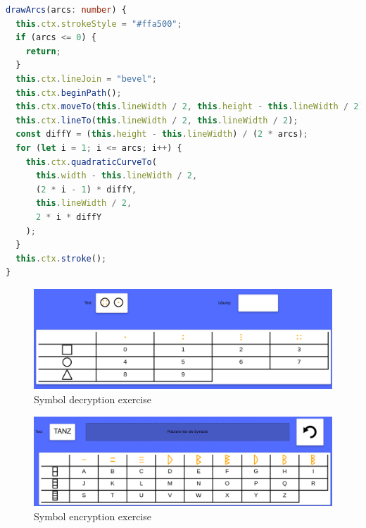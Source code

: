 \begin{lstlisting}[language=TypeScript,caption={Implementation of drawing a variable amount of arc symbols},label={lst:drawArcs}]
drawArcs(arcs: number) {
  this.ctx.strokeStyle = "#ffa500";
  if (arcs <= 0) {
    return;
  }
  this.ctx.lineJoin = "bevel";
  this.ctx.beginPath();
  this.ctx.moveTo(this.lineWidth / 2, this.height - this.lineWidth / 2);
  this.ctx.lineTo(this.lineWidth / 2, this.lineWidth / 2);
  const diffY = (this.height - this.lineWidth) / (2 * arcs);
  for (let i = 1; i <= arcs; i++) {
    this.ctx.quadraticCurveTo(
      this.width - this.lineWidth / 2,
      (2 * i - 1) * diffY,
      this.lineWidth / 2,
      2 * i * diffY
    );
  }
  this.ctx.stroke();
}
\end{lstlisting}

\begin{figure} 
  \centering
  \includegraphics[width=1.0 \columnwidth]{figures/symbol_decrypt.png}
  \caption{Symbol decryption exercise} 
  \label{fig:symbolDecryption} 
\end{figure}

\begin{figure} 
  \centering
  \includegraphics[width=1.0 \columnwidth]{figures/symbol_encrypt.png}
  \caption{Symbol encryption exercise} 
  \label{fig:symbolEncryption} 
\end{figure}
